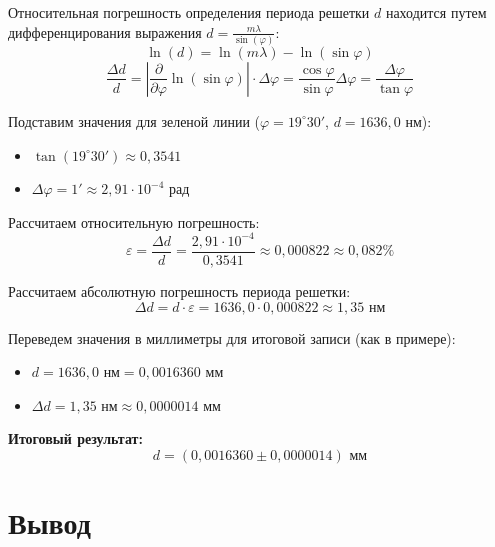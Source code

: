 \documentclass[a4paper,12pt]{article}
\begin{document}
\noindent Относительная погрешность определения периода решетки $d$ находится путем дифференцирования выражения $d = \frac{m\lambda}{\sin(\varphi)}$:
\begin{equation*}
\ln(d) = \ln(m\lambda) - \ln(\sin\varphi)
\end{equation*}
\begin{equation*}
\frac{\Delta d}{d} = \left| \frac{\partial}{\partial \varphi} \ln(\sin\varphi) \right| \cdot \Delta \varphi = \frac{\cos\varphi}{\sin\varphi} \Delta \varphi = \frac{\Delta \varphi}{\tan\varphi}
\end{equation*}

\noindent Подставим значения для зеленой линии ($\varphi = 19^\circ 30'$, $d = 1636,0$ нм):
\begin{itemize}
    \item $\tan(19^\circ 30') \approx 0,3541$
    \item $\Delta \varphi = 1' \approx 2,91 \cdot 10^{-4}$ рад
\end{itemize}

\noindent Рассчитаем относительную погрешность:
\begin{equation*}
\varepsilon = \frac{\Delta d}{d} = \frac{2,91 \cdot 10^{-4}}{0,3541} \approx 0,000822 \approx 0,082\%
\end{equation*}

\noindent Рассчитаем абсолютную погрешность периода решетки:
\begin{equation*}
\Delta d = d \cdot \varepsilon = 1636,0 \cdot 0,000822 \approx 1,35 \text{ нм}
\end{equation*}

\noindent Переведем значения в миллиметры для итоговой записи (как в примере):
\begin{itemize}
    \item $d = 1636,0 \text{ нм} = 0,0016360 \text{ мм}$
    \item $\Delta d = 1,35 \text{ нм} \approx 0,0000014 \text{ мм}$
\end{itemize}

\noindent \textbf{Итоговый результат:}
\begin{equation*}
d = (0,0016360 \pm 0,0000014) \text{ мм}
\end{equation*}




\section{Вывод}
\end{document}

